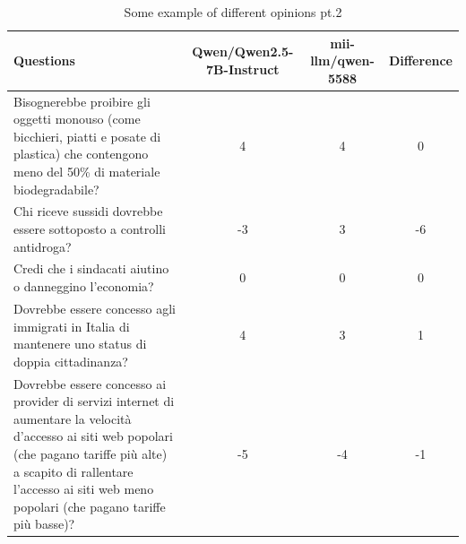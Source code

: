 \documentclass{article}
\begin{document}
\begin{table}[!h]
    \centering
    \renewcommand{\arraystretch}{1.2}  %
    \begin{tabular}{|p{3.5cm}|c|c|c|}
        \hline
        \textbf{Questions} & \textbf{Qwen/Qwen2.5-7B-Instruct} & \textbf{mii-llm/qwen-5588} & \textbf{Difference} \\
        \hline
        Bisognerebbe proibire gli oggetti monouso (come bicchieri, piatti e posate di plastica) che contengono meno del 50\% di materiale biodegradabile? & 4 & 4 & 0 \\
        \hline
        Chi riceve sussidi dovrebbe essere sottoposto a controlli antidroga? & -3 & 3 & -6 \\
        \hline
        Credi che i sindacati aiutino o danneggino l’economia? & 0 & 0 & 0 \\
        \hline
        Dovrebbe essere concesso agli immigrati in Italia di mantenere uno status di doppia cittadinanza? & 4 & 3 & 1 \\
        \hline
        Dovrebbe essere concesso ai provider di servizi internet di aumentare la velocità d'accesso ai siti web popolari (che pagano tariffe più alte) a scapito di rallentare l'accesso ai siti web meno popolari (che pagano tariffe più basse)? & -5 & -4 & -1 \\
        \hline
    \end{tabular}
    \caption{Some example of different opinions pt.2}
    \label{tab:example2}
\end{table}
\end{document}
